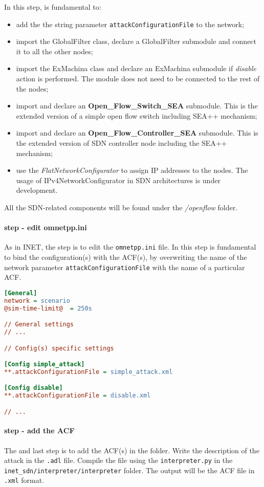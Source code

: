 In this step, is fundamental to:
%
\begin{itemize}
\item add the the string parameter \texttt{attackConfigurationFile} to the network;
\item import the GlobalFilter class, declare a GlobalFilter submodule and connect it to all the other nodes;
\item import the ExMachina class and declare an ExMachina submodule if \emph{disable} action is performed. The module does not need to be connected to the rest of the nodes;
\item import and declare an \textbf{Open\_Flow\_Switch\_SEA} submodule. This is the extended version of a simple open flow switch including SEA++ mechanism;
\item import and declare an \textbf{Open\_Flow\_Controller\_SEA} submodule. This is the extended version of SDN controller node including the SEA++ mechanism;
\item use the \emph{FlatNetworkConfigurator} to assign IP addresses to the nodes. The usage of IPv4NetworkConfigurator in SDN architectures is under development.
\end{itemize}

All the SDN-related components will be found under the \emph{/openflow} folder.
\paragraph{ step - edit omnetpp.ini}
As in INET, the  step is to edit the \texttt{omnetpp.ini} file. In this step is fundamental to bind the configuration(s) with the ACF(s), by overwriting the name of the network parameter \texttt{attackConfigurationFile} with the name of a particular ACF.
%
\begin{lstlisting}[language={ini}]
[General]
network = scenario
@sim-time-limit@  = 250s

// General settings 
// ...

// Config(s) specific settings

[Config simple_attack]
**.attackConfigurationFile = simple_attack.xml

[Config disable]
**.attackConfigurationFile = disable.xml

// ...
\end{lstlisting}

\paragraph{ step - add the ACF}
The  and last step is to add the ACF(s) in the folder.
Write the description of the attack in the \texttt{.adl} file. Compile the file using the \texttt{interpreter.py} in the \texttt{inet\_sdn/interpreter/interpreter} folder. The output will be the ACF file in \texttt{.xml} format.

